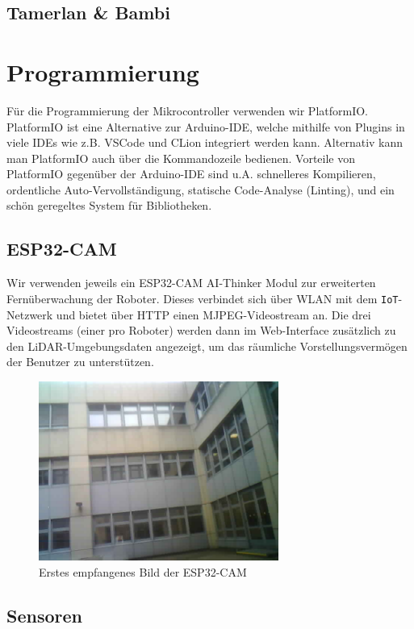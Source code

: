 \documentclass[12pt]{article}
\begin{document}
	\subsection{Tamerlan \& Bambi}
	\section{Programmierung}
	Für die Programmierung der Mikrocontroller verwenden wir PlatformIO.
	PlatformIO ist eine Alternative zur Arduino-IDE,
	welche mithilfe von Plugins in viele IDEs wie z.B. VSCode und CLion integriert werden kann.
	Alternativ kann man PlatformIO auch über die Kommandozeile bedienen.
	Vorteile von PlatformIO gegenüber der Arduino-IDE sind u.A. schnelleres Kompilieren,
	ordentliche Auto-Vervollständigung,
	statische Code-Analyse (Linting),
	und ein schön geregeltes System für Bibliotheken.

	\subsection{ESP32-CAM}
	Wir verwenden jeweils ein ESP32-CAM AI-Thinker Modul zur erweiterten
	Fernüberwachung der Roboter.
	Dieses verbindet sich über WLAN mit dem \verb|IoT|-Netzwerk und bietet über HTTP einen MJPEG-Videostream an.
	Die drei Videostreams (einer pro Roboter) werden dann im Web-Interface
	zusätzlich zu den LiDAR-Umgebungsdaten angezeigt,
	um das räumliche Vorstellungsvermögen der Benutzer zu unterstützen.
	\begin{figure}[H]
		\includegraphics[width=0.7\textwidth, center]{img/cam_erstes_bild.png}
		\caption{Erstes empfangenes Bild der ESP32-CAM}
		\label{fig:cam_erstes_bild}
	\end{figure}
	\subsection{Sensoren}
\end{document}
